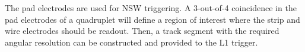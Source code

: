 The pad electrodes are used for NSW triggering. A 3-out-of-4 coincidence in the pad electrodes of a quadruplet will define a region of interest where the strip and wire electrodes should be readout. Then, a track segment with the required angular resolution can be constructed and provided to the L1 trigger. 































